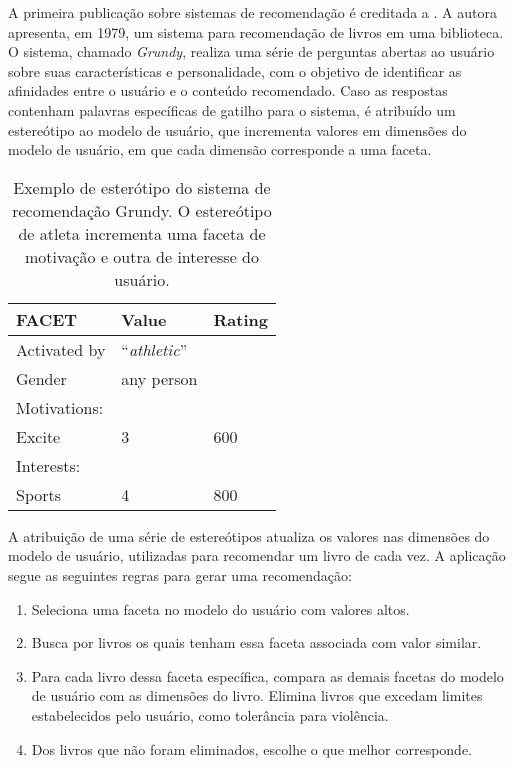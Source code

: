 A primeira publicação sobre sistemas de recomendação é creditada a
\citet{rich1979user}. A autora apresenta, em 1979, um sistema para recomendação
de livros em uma biblioteca. O sistema, chamado \textit{Grundy}, realiza uma
série de perguntas abertas ao usuário sobre suas características e
personalidade, com o objetivo de identificar as afinidades entre o usuário e o
conteúdo recomendado. Caso as respostas contenham palavras específicas de
gatilho para o sistema, é atribuído um estereótipo ao modelo de usuário, que
incrementa valores em dimensões do modelo de usuário, em que cada dimensão
corresponde a uma faceta.

\vspace{2em}
\begin{table}[h!]
   \begin{center}
      \begin{tabular}{|m{3cm}|m{2cm}|m{2cm}|}
          \hline
          \textbf{FACET} & \textbf{Value} & \textbf{Rating} \\
          \hline
          Activated by & ``\textit{athletic}'' & \\
          Gender & any person & \\
          \hline
          Motivations: & & \\
          \hspace{1mm} Excite & 3 & 600 \\
          \hline
          Interests: & & \\
          \hspace{1mm} Sports & 4 & 800 \\
          \hline
      \end{tabular}
      \caption{Exemplo de esterótipo do sistema de recomendação Grundy. O estereótipo de atleta incrementa uma faceta de motivação e outra de interesse do usuário.}
      \label{grundy}
   \end{center}
   \end{table}

A atribuição de uma série de estereótipos atualiza os valores nas dimensões do
modelo de usuário, utilizadas para recomendar um livro de cada vez. A aplicação
segue as seguintes regras para gerar uma recomendação:

\begin{enumerate}
   \item Seleciona uma faceta no modelo do usuário com valores altos.
   \item Busca por livros os quais tenham essa faceta associada com valor similar.
   \item Para cada livro dessa faceta específica, compara as demais facetas
   do modelo de usuário com as dimensões do livro. Elimina livros que excedam
   limites estabelecidos pelo usuário, como tolerância para violência.
   \item Dos livros que não foram eliminados, escolhe o que melhor corresponde.
\end{enumerate}

